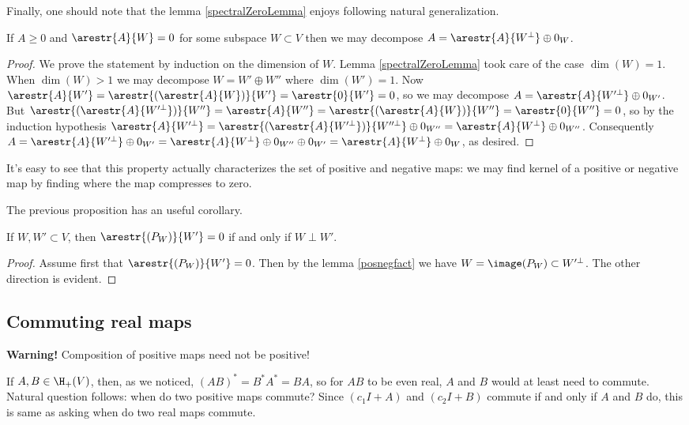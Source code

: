 Finally, one should note that the lemma \ref{spectralZeroLemma} enjoys following natural generalization.

\begin{prop}\label{posnegfact}
	If $A \geq 0$ and $\arestr{A}{W} = 0$ for some subspace $W \subset V$ then we may decompose $A = \arestr{A}{W^{\perp}} \oplus 0_{W}$.
\end{prop}
\begin{proof}
	We prove the statement by induction on the dimension of $W$. Lemma \ref{spectralZeroLemma} took care of the case $\dim(W) = 1$. When $\dim(W) > 1$ we may decompose $W = W' \oplus W''$ where $\dim(W') = 1$. Now $\arestr{A}{W'} = \arestr{(\arestr{A}{W})}{W'} = \arestr{0}{W'} = 0$, so we may decompose $A = \arestr{A}{W'^{\perp}} \oplus 0_{W'}$. But $\arestr{(\arestr{A}{W'^{\perp}})}{W''} = \arestr{A}{W''} = \arestr{(\arestr{A}{W})}{W''} = \arestr{0}{W''} = 0$, so by the induction hypothesis $\arestr{A}{W'^{\perp}} = \arestr{(\arestr{A}{W'^{\perp}})}{W''^{\perp}} \oplus 0_{W''} = \arestr{A}{W^{\perp}} \oplus 0_{W''}$. Consequently $A = \arestr{A}{W'^{\perp}} \oplus 0_{W'} = \arestr{A}{W^{\perp}} \oplus 0_{W''} \oplus 0_{W'} = \arestr{A}{W^{\perp}} \oplus 0_{W}$, as desired.
\end{proof}
It's easy to see that this property actually characterizes the set of positive and negative maps: we may find kernel of a positive or negative map by finding where the map compresses to zero.

The previous proposition has an useful corollary.

\begin{kor}\label{projection_compression}
	If $W, W' \subset V$, then $\arestr{(P_{W})}{W'} = 0$ if and only if $W \perp W'$.
\end{kor}
\begin{proof}
	Assume first that $\arestr{(P_{W})}{W'} = 0$. Then by the lemma \ref{posnegfact} we have $W = \image(P_{W}) \subset W'^{\perp}$. The other direction is evident.
\end{proof}


\subsection{Commuting real maps}

\textbf{Warning!} Composition of positive maps need not be positive!

If $A, B \in \H_{+}(V)$, then, as we noticed, $(A B)^{*} = B^{*} A^{*} = B A$, so for $A B$ to be even real, $A$ and $B$ would at least need to commute. Natural question follows: when do two positive maps commute? Since $(c_{1} I + A)$ and $(c_{2} I + B)$ commute if and only if $A$ and $B$ do, this is same as asking when do two real maps commute.

